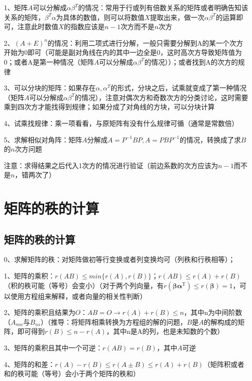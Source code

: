 1、矩阵$A$可以分解成$\alpha\beta^T$的情况：常用于行或列有倍数关系的矩阵或者明确告知该关系的矩阵，$\beta^T\alpha$为具体的数值，则可以将数值$X$提取出来，做一次$\alpha\beta^T$的运算即可，注意此时数值$X$的指数应该是$n-1$次方而不是$n$次方

2、$(A+E)^n$的情况：利用二项式进行分解，一般只需要分解到A的某一个次方开始为0即可（可能是副对角线在内的其中一边全是0，这时高次方导致矩阵值为0；或者A是第一种情况（矩阵$A$可以分解成$\alpha\beta^T$的情况））；或者找到A的次方的规律

3、可以分块的矩阵：如果存在$\alpha,\alpha^T$的形式，分块之后，试乘就变成了第一种情况（矩阵$A$可以分解成$\alpha\beta^T$的情况），注意对偶次方和奇数次方的分类讨论，这时需要乘到四次方才能找得到规律；如果分成了对角线的方块，可以分块计算

4、试乘找规律：乘一项看看，与原矩阵有没有什么规律可循（通常是常数倍）

5、求解相似对角阵：矩阵$A$分解成$A=P^{-1}BP,A=PBP^{-1}$的情况，转换成了求$B$的$n$次方问题

注意：求得结果之后代入1次方的情况进行验证（前边系数的次方应该为$n-1$而不是$n$，错两次了）

\section{矩阵的秩的计算}



\subsection{矩阵的秩的计算}

0、求解矩阵的秩：对矩阵做初等行变换或者列变换均可（列秩和行秩相等）；

1、矩阵的乘积：$r(AB) \leqslant min\{r(A),r(B)\}$；$r(AB) \leqslant r(A)+r(B)$（积的秩可能（等号）会变小）（对于两个列向量，有$r\left(\boldsymbol{\beta} \boldsymbol{\alpha}^{\mathrm{T}}\right) \leqslant r(\boldsymbol{\beta})=1$，可以使用方程组来解释，或者向量的相关性判断）

2、矩阵的乘积且结果为$O$：$AB=O \rightarrow r(A)+r(B) \leqslant n$，其中n为中间阶数（$A_{mn}$与$B_{ns}$）（推导：将矩阵相乘转换为方程组的解的问题，$B$是$A$的解构成的矩阵，即可得到$r(B)\leqslant n - r(A) $，其中n是A的列，也是未知数的个数）

3、矩阵的乘积且其中一个可逆：$r(AB)=r(B)$，其中$A$可逆

4、矩阵的和差：$r(A)-r(B)\leqslant r(A\pm B) \leqslant r(A)+r(B)$（矩阵积或者和的秩可能（等号）会小于两个矩阵的秩和）

